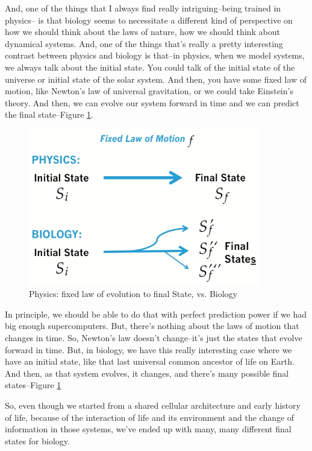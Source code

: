 \documentclass[]{article}
\begin{document}
And, one of the things that I always find really intriguing--being trained in physics--
is that biology seems to necessitate a different kind of perspective
on how we should think about the laws of nature, how we should think about dynamical systems.
And, one of the things that's really a pretty interesting contrast between physics and biology is that--in physics, when we model systems, we always talk about the initial state.
You could talk of the initial state of the universe or initial state of the solar system.
And then, you have some fixed law of motion, like Newton's law of universal gravitation, or we could take Einstein's theory. 
And then, we can evolve our system forward in time and we can predict the final state--Figure \ref{fig:PhysicsvsBiology}.
\begin{figure}[H]
	\caption{Physics: fixed law of evolution to final State, vs. Biology}\label{fig:PhysicsvsBiology}
	\includegraphics[width=0.9\textwidth]{PhysicsvsBiology}
\end{figure}

In principle, we should be able to do that with perfect prediction power if we had
big enough supercomputers.
But, there's nothing about the laws of motion that changes in time.
So, Newton's law doesn't change--it's just the states that evolve forward in time.
But, in biology, we have this really interesting case where we have an initial state, like that last universal common ancestor of life on Earth.
And then, as that system evolves, it changes, and there's many possible final states--Figure \ref{fig:PhysicsvsBiology}


So, even though we started from a shared cellular architecture and early history of life,
because of the interaction of life and its environment and the change of information in those systems, we've ended up with many, many different final states for biology.
\end{document}
